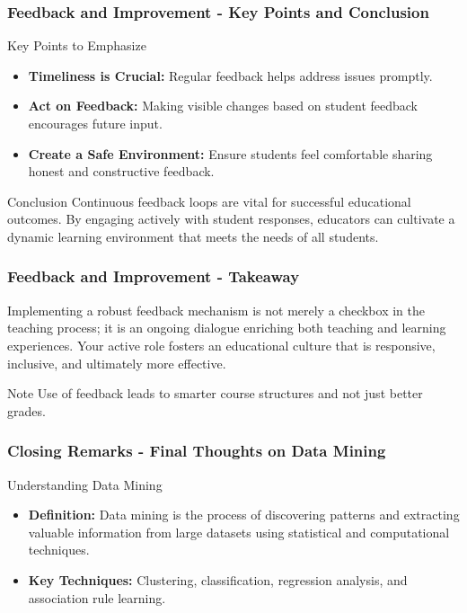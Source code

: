 \documentclass[aspectratio=169]{beamer}
\begin{document}
\begin{frame}[fragile]
    \frametitle{Feedback and Improvement - Key Points and Conclusion}
    \begin{block}{Key Points to Emphasize}
        \begin{itemize}
            \item \textbf{Timeliness is Crucial:} Regular feedback helps address issues promptly.
            \item \textbf{Act on Feedback:} Making visible changes based on student feedback encourages future input.
            \item \textbf{Create a Safe Environment:} Ensure students feel comfortable sharing honest and constructive feedback.
        \end{itemize}
    \end{block}

    \begin{block}{Conclusion}
        Continuous feedback loops are vital for successful educational outcomes. By engaging actively with student responses, educators can cultivate a dynamic learning environment that meets the needs of all students.
    \end{block}
\end{frame}

\begin{frame}[fragile]
    \frametitle{Feedback and Improvement - Takeaway}
    Implementing a robust feedback mechanism is not merely a checkbox in the teaching process; it is an ongoing dialogue enriching both teaching and learning experiences. Your active role fosters an educational culture that is responsive, inclusive, and ultimately more effective.
    
    \begin{block}{Note}
        Use of feedback leads to smarter course structures and not just better grades.
    \end{block}
\end{frame}

\begin{frame}[fragile]
    \frametitle{Closing Remarks - Final Thoughts on Data Mining}
    \begin{block}{Understanding Data Mining}
        \begin{itemize}
            \item \textbf{Definition:} Data mining is the process of discovering patterns and extracting valuable information from large datasets using statistical and computational techniques.
            \item \textbf{Key Techniques:} Clustering, classification, regression analysis, and association rule learning.
        \end{itemize}
    \end{block}
\end{frame}
\end{document}

